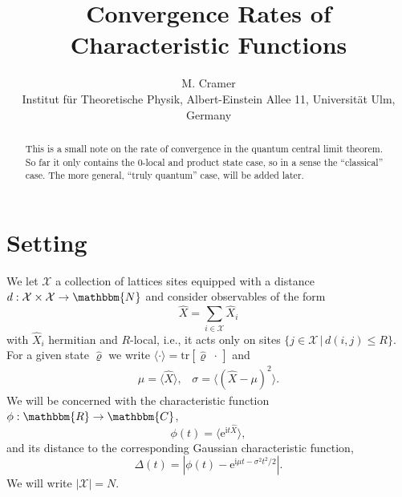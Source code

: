 \documentclass[aps,10pt,epsfig,graphics,mathbbm]{article}
\newcommand{\me}{\mathrm{e}}
\newcommand{\mi}{\mathrm{i}}
\newcommand{\cc}{\mathbbm{C}}
\newcommand{\nn}{\mathbbm{N}}
\newcommand{\rr}{\mathbbm{R}}
\begin{document}
\title{\Large\bf Convergence Rates of Characteristic Functions}

\author{{\large
M. Cramer}\\ \small Institut f\"ur Theoretische Physik, Albert-Einstein
Allee 11, Universit\"at Ulm, Germany}
\date{}
\maketitle

\vspace*{-.6cm}


\maketitle
\begin{abstract}
This is a small note on the rate of convergence in the quantum central limit theorem. So far it only contains the $0$-local and product state case, so in a sense the ``classical'' case.
The more general, ``truly quantum'' case, will be added later. 
\end{abstract}

\section{Setting}

We let $\mathcal{X}$ a collection of lattices sites equipped with a distance $d:\mathcal{X}\times\mathcal{X}\rightarrow \nn$ and consider observables of the form 
\begin{equation}
\hat{X}=\sum_{i\in\mathcal{X}}\hat{X}_i
\end{equation}
with $\hat{X}_i$ hermitian and $R$-local, i.e., it acts only on sites $\{j\in\mathcal{X}\,|\,d(i,j)\le R\}$. For a given state $\hat{\varrho}$ we write $\langle\cdot\rangle=\text{tr}[\hat{\varrho}\;\cdot\,]$ and
\begin{equation}
\begin{split}
\mu=\langle\hat{X}\rangle,\;\;\;\sigma=\langle (\hat{X}-\mu)^2\rangle.
\end{split}
\end{equation}
We will be concerned with the characteristic function $\phi:\rr\rightarrow\cc$,
\begin{equation}
\phi(t)=\langle\me^{\mi t\hat{X}}\rangle,
\end{equation}
and its distance to the corresponding Gaussian characteristic function,
\begin{equation}
\Delta(t)=|\phi(t)-\me^{\mi \mu t-\sigma^2t^2/2}|.
\end{equation}
We will write $|\mathcal{X}|=N$.
\end{document}
